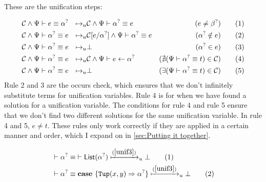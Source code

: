 \documentclass[twoside,12pt,a4paper]{article}
\begin{document}
These are the unification steps: 
\begin{definition}[Unification]
    \begin{align*}
        &\constraints \wedge \Psi \vdash e \equiv\alphaunifvar
        &\mapsto_u& \constraints \wedge \Psi \vdash \alphaunifvar \equiv e &(e\neq \betaunifvar)
        \tag{1}\label{unif1}\\
        &\constraints \wedge \Psi \vdash \alphaunifvar \equiv e 
        &\mapsto_u& \constraints[e/\alphaunifvar] \wedge \Psi \vdash \alphaunifvar \equiv e &(\alphaunifvar \notin e)%
        \tag{2}\label{unif2}\\
        &\constraints \wedge \Psi \vdash \alphaunifvar \equiv e
        &\mapsto_u& \bot &(\alphaunifvar\in e) %
        \tag{3}\label{unif3}\\
        &\constraints \wedge \Psi \vdash \alphaunifvar \equiv e 
        &\mapsto_u& \constraints \wedge \Psi\vdash e \leftarrow \alphaunifvar &(\nexists (\Psi\vdash\alphaunifvar\equiv t)\in \constraints)
        \tag{4}\label{unif4}\\
        &\constraints \wedge \Psi\vdash \alphaunifvar \equiv e 
        &\mapsto_u& \bot &(\exists (\Psi\vdash\alphaunifvar\equiv t) \in \constraints)
        \tag{5}\label{unif5}    
    \end{align*}
Rule 2 and 3 are the occurs check, which ensures that we don't infinitely substitute terms for unification variables.
Rule 4 is for when we have found a solution for a unification variable. The conditions for rule 4 and rule 5 
ensure that we don't find two different solutions for the same unification variable.
In rule 4 and 5, $e\neq t$.
These rules only work correctly if they are applied in a certain manner and order, 
which I expand on in \cref{sec:Putting it together}. 
\end{definition}

\begin{example}
    \begin{align*}
        &\vdash\alpha^? \equiv \; \vdash \mathsf{List(}\alpha^?\mathsf{)} \xmapsto{(\ref{unif3})}_u \bot\tag{1}\\
        &\vdash\alpha^? \equiv \textbf{case}\ \{\mathtt{Tup(}x, y\mathtt{)}\Rightarrow \alpha^?\}\xmapsto{(\ref{unif3})}_u \bot\tag{2}
    \end{align*}
\end{example}

\end{document}

